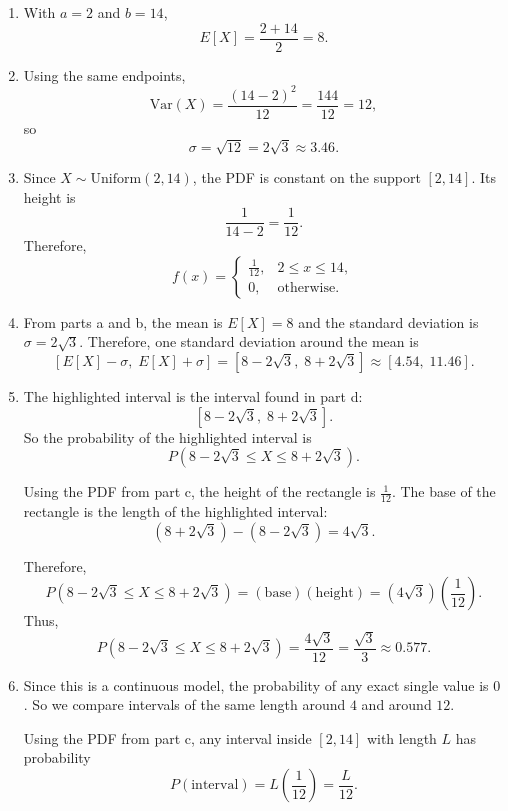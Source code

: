\begin{enumerate}[label=\textbf{\alph*)}]
	\item With \(a=2\) and \(b=14\),
	\[
	E[X]=\frac{2+14}{2}=8.
	\]
	
	\item Using the same endpoints,
	\[
	\mathrm{Var}(X)=\frac{(14-2)^2}{12}=\frac{144}{12}=12,
	\]
	so
	\[
	\sigma=\sqrt{12}=2\sqrt{3}\approx 3.46.
	\]
	
	\item Since \(X\sim\text{Uniform}(2,14)\), the PDF is constant on the support \([2,14]\). Its height is
	\[
	\frac{1}{14-2}=\frac{1}{12}.
	\]
	Therefore,
	\[
	f(x)=
	\begin{cases}
		\frac{1}{12}, & 2\le x\le 14,\\
		0, & \text{otherwise}.
	\end{cases}
	\]
	
	\item From parts a and b, the mean is \(E[X]=8\) and the standard deviation is \(\sigma=2\sqrt{3}\). Therefore, one standard deviation around the mean is
	\[
	\left[E[X]-\sigma,\;E[X]+\sigma\right]
	=
	\left[8-2\sqrt{3},\;8+2\sqrt{3}\right]
	\approx [4.54,\;11.46].
	\]
	
	
	\item The highlighted interval is the interval found in part d:
	\[
	\left[8-2\sqrt{3},\;8+2\sqrt{3}\right].
	\]
	So the probability of the highlighted interval is
	\[
	P\left(8-2\sqrt{3}\le X\le 8+2\sqrt{3}\right).
	\]
	
	Using the PDF from part c, the height of the rectangle is \(\frac{1}{12}\). The base of the rectangle is the length of the highlighted interval:
	\[
	\left(8+2\sqrt{3}\right)-\left(8-2\sqrt{3}\right)=4\sqrt{3}.
	\]
	
	Therefore,
	\[
	P\left(8-2\sqrt{3}\le X\le 8+2\sqrt{3}\right)
	=
	(\text{base})(\text{height})
	=
	(4\sqrt{3})\left(\frac{1}{12}\right).
	\]
	Thus,
	\[
	P\left(8-2\sqrt{3}\le X\le 8+2\sqrt{3}\right)
	=
	\frac{4\sqrt{3}}{12}
	=
	\frac{\sqrt{3}}{3}
	\approx 0.577.
	\]
	
	
	\item Since this is a continuous model, the probability of any exact single value is \(0\). So we compare intervals of the same length around \(4\) and around \(12\).
	
	Using the PDF from part c, any interval inside \([2,14]\) with length \(L\) has probability
	\[
	P(\text{interval})=L\left(\frac{1}{12}\right)=\frac{L}{12}.
	\]
	

\end{enumerate}
